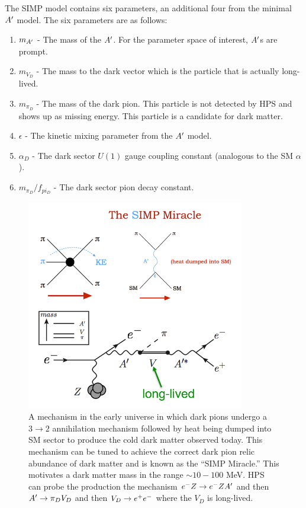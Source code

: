 The SIMP model contains six parameters, an additional four from the minimal $A^\prime$ model. %
The six parameters are as follows:

\begin{enumerate}
  \item $m_{A^\prime}$ - The mass of the $A^\prime$. For the parameter space of interest, $A^\prime$s are prompt.
  \item $m_{V_D}$ - The mass to the dark vector which is the particle that is actually long-lived.
  \item $m_{\pi_D}$ - The mass of the dark pion. This particle is not detected by HPS and shows up as missing energy. This particle is a candidate for dark matter.
  \item $\epsilon$ - The kinetic mixing parameter from the $A^\prime$ model.
  \item $\alpha_{D}$ - The dark sector $U(1)$ gauge coupling constant (analogous to the SM $\alpha$).
  \item $m_{\pi_D}/f_{pi_D}$ - The dark sector pion decay constant.
\end{enumerate}

\begin{figure}
    \centering
    \includegraphics[width=0.85\textwidth]{figs/upgrades/simpmiracle.png}
    \caption{A mechanism in the early universe in which dark pions undergo a $3 \rightarrow 2$ annihilation mechanism followed by heat being dumped into SM sector to produce the cold dark matter observed today. This mechanism can be tuned to achieve the correct dark pion relic abundance of dark matter and is known as the ``SIMP Miracle.'' This motivates a dark matter mass in the range $\sim 10 - 100$ MeV. HPS can probe the production the mechanism $e^-Z \rightarrow e^-ZA^\prime$ and then $A^\prime \rightarrow \pi_D V_D$ and then $V_D \rightarrow e^{+}e^{-}$ where the $V_D$ is long-lived.}
    \label{fig:simpmiracle}
\end{figure}

